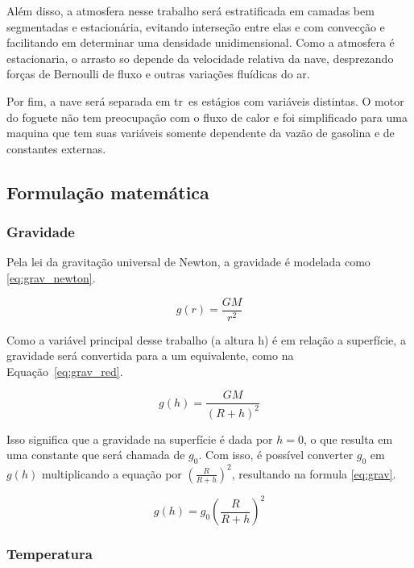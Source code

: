 Além disso, a atmosfera nesse trabalho será estratificada em camadas bem segmentadas e estacionária, evitando interseção entre elas e com convecção e facilitando em determinar uma densidade unidimensional. Como a atmosfera é estacionaria, o arrasto so depende da velocidade relativa da nave, desprezando forças de Bernoulli de fluxo e outras variações fluídicas do ar.

Por fim, a nave será separada em tr~es estágios com variáveis distintas. O motor do foguete não tem preocupação com o fluxo de calor e foi simplificado para uma maquina que tem suas variáveis somente dependente da vazão de gasolina e de constantes externas.

\subsection{Formulação matemática}

\subsubsection{Gravidade}

Pela lei da gravitação universal de Newton, a gravidade é modelada como \eqref{eq:grav_newton}.

\begin{equation}
  g(r)=\frac{G M}{r^2}
  \label{eq:grav_newton}
\end{equation}

Como a variável principal desse trabalho (a altura h) é em relação a superfície, a gravidade será convertida para a um equivalente, como na Equação~\eqref{eq:grav_red}.

\begin{equation}
  g(h)=\frac{G M}{(R+h)^2}
  \label{eq:grav_red}
\end{equation}

Isso significa que a gravidade na superfície é dada por \(h=0\), o que resulta em uma constante que será chamada de \(g_0\). Com isso, é possível converter \(g_0\) em \(g(h)\) multiplicando a equação por \((\frac{R}{R+h})^2\), resultando na formula \eqref{eq:grav}.

\begin{equation}
  g(h)=g_0(\frac{R}{R+h})^2
  \label{eq:grav}
\end{equation}

\subsubsection{Temperatura}

